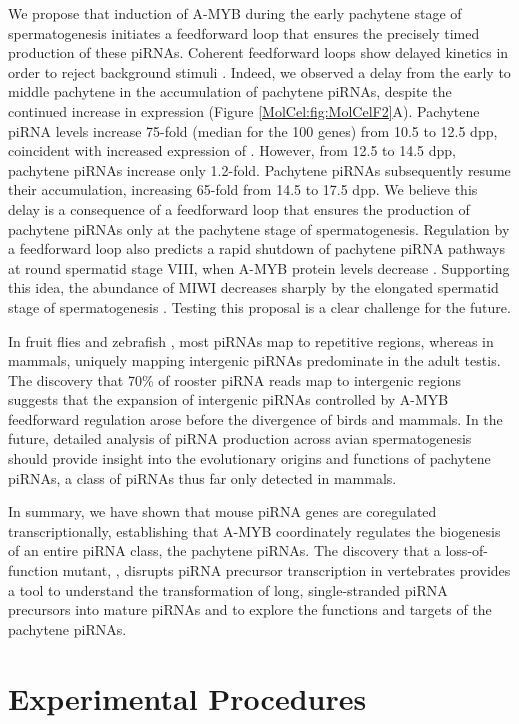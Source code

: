   We propose that induction of A-MYB during the early pachytene stage of spermatogenesis initiates a feedforward loop that ensures the precisely timed production of these piRNAs. Coherent feedforward loops show delayed kinetics in order to reject background stimuli \citep{Mangan2003}. Indeed, we observed a delay from the early to middle pachytene in the accumulation of pachytene piRNAs, despite the continued increase in \amyb{} expression (Figure \ref{MolCel:fig:MolCelF2}A). Pachytene piRNA levels increase 75-fold (median for the 100 genes) from 10.5 to 12.5 dpp, coincident with increased expression of \amyb{}. However, from 12.5 to 14.5 dpp, pachytene piRNAs increase only 1.2-fold. Pachytene piRNAs subsequently resume their accumulation, increasing 65-fold from 14.5 to 17.5 dpp. We believe this delay is a consequence of a feedforward loop that ensures the production of pachytene piRNAs only at the pachytene stage of spermatogenesis. Regulation by a feedforward loop also predicts a rapid shutdown of pachytene piRNA pathways at round spermatid stage VIII, when A-MYB protein levels decrease \citep{Horvath2009}. Supporting this idea, the abundance of MIWI decreases sharply by the elongated spermatid stage of spermatogenesis \citep{Deng2002c}. Testing this proposal is a clear challenge for the future.

  In fruit flies and zebrafish \citep{Brennecke2007, Houwing2007}, most piRNAs map to repetitive regions, whereas in mammals, uniquely mapping intergenic piRNAs predominate in the adult testis. The discovery that 70\% of rooster piRNA reads map to intergenic regions suggests that the expansion of intergenic piRNAs controlled by A-MYB feedforward regulation arose before the divergence of birds and mammals. In the future, detailed analysis of piRNA production across avian spermatogenesis should provide insight into the evolutionary origins and functions of pachytene piRNAs, a class of piRNAs thus far only detected in mammals.

  In summary, we have shown that mouse piRNA genes are coregulated transcriptionally, establishing that A-MYB coordinately regulates the biogenesis of an entire piRNA class, the pachytene piRNAs. The discovery that a loss-of-function \amyb{} mutant, \mybrepro{}, disrupts piRNA precursor transcription in vertebrates provides a tool to understand the transformation of long, single-stranded piRNA precursors into mature piRNAs and to explore the functions and targets of the pachytene piRNAs.

\section{Experimental Procedures}
  \label{MolCel:sec:Experimental Procedures}

